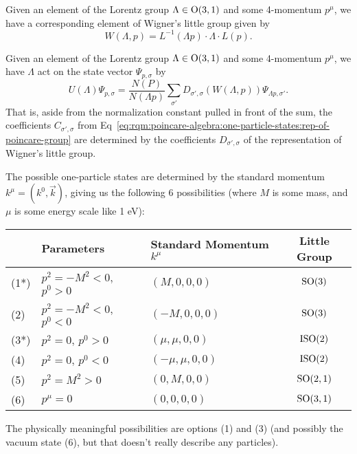 \begin{corollary}
Given an element of the Lorentz group $\Lambda\in\mathrm{O}(3,1)$ and some
4-momentum $p^{\mu}$, we have a corresponding element of Wigner's little
group given by
\begin{equation}
W(\Lambda,p) = L^{-1}(\Lambda p)\cdot\Lambda\cdot L(p).
\end{equation}
\end{corollary}

\begin{corollary}
Given an element of the Lorentz group $\Lambda\in\mathrm{O}(3,1)$ and some
4-momentum $p^{\mu}$, we have $\Lambda$ act on the state vector
$\Psi_{p,\sigma}$ by
\begin{equation}
U(\Lambda)\Psi_{p,\sigma} = \frac{N(P)}{N(\Lambda p)}\sum_{\sigma'}D_{\sigma',\sigma}(W(\Lambda, p))\Psi_{\Lambda p,\sigma'}.
\end{equation}
That is, aside from the normalization constant pulled in front of the
sum, the coefficients $C_{\sigma',\sigma}$ from Eq~\eqref{eq:rqm:poincare-algebra:one-particle-states:rep-of-poincare-group} are determined by the
coefficients $D_{\sigma',\sigma}$ of the representation of Wigner's
little group.
\end{corollary}

The possible one-particle states are determined by the standard momentum
$k^{\mu}=(k^{0},\vec{k})$, giving us the following 6 possibilities (where $M$ is some
mass, and $\mu$ is some energy scale like 1 eV):
\begin{center}
\begin{tabular}{ll|l|c}
    & Parameters & Standard Momentum $k^{\mu}$ & Little Group\\\hline
(1*) & $p^{2}=-M^{2}<0$, $p^{0}>0$ & $(M,0,0,0)$ & $\operatorname{SO}(3)$\\
(2) & $p^{2}=-M^{2}<0$, $p^{0}<0$ & $(-M,0,0,0)$ & $\operatorname{SO}(3)$\\
(3*) & $p^{2}=0$, $p^{0}>0$ & $(\mu,\mu,0,0)$ & $\mathrm{ISO}(2)$\\
(4) & $p^{2}=0$, $p^{0}<0$ & $(-\mu,\mu,0,0)$ & $\mathrm{ISO}(2)$\\
(5) & $p^{2}=M^{2}>0$ & $(0,M,0,0)$ & $\operatorname{SO}(2,1)$\\
(6) & $p^{\mu}=0$ & $(0,0,0,0)$ & $\operatorname{SO}(3,1)$
\end{tabular}
\end{center}
The physically meaningful possibilities are options (1) and (3) (and
possibly the vacuum state (6), but that doesn't really describe any particles).

